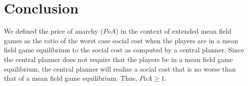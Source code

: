 \documentclass[11pt]{article}
\begin{document}

\section{\textbf{Conclusion}} \label{sec:conclusion}
We defined the price of anarchy ($PoA$) in the context of extended mean field games as the ratio of the worst case social cost when the players are in a mean field game equilibrium to the social cost as computed by a central planner. Since the central planner does not require that the players be in a mean field game equilibrium, the central planner will realize a social cost that is no worse than that of a mean field game equilibrium. Thus, $PoA \geq 1$.
\end{document}
